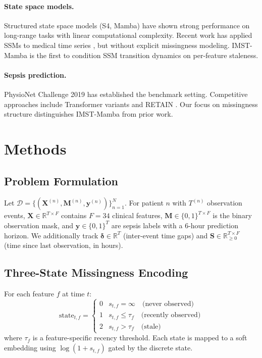 \documentclass[11pt,a4paper]{article}
\begin{document}
\paragraph{State space models.}
Structured state space models (S4, Mamba) \citep{gu2022s4,gu2023mamba} have
shown strong performance on long-range tasks with linear computational
complexity.  Recent work has applied SSMs to medical time
series \citep{nguyen2024s4health}, but without explicit missingness modeling.
IMST-Mamba is the first to condition SSM transition dynamics on per-feature
staleness.

\paragraph{Sepsis prediction.}
PhysioNet Challenge 2019 \citep{reyna2020early} has established the benchmark
setting.  Competitive approaches include Transformer
variants \citep{tipirneni2022selfsupervised} and RETAIN \citep{choi2016retain}.
Our focus on missingness structure distinguishes IMST-Mamba from prior work.

\section{Methods}
\label{sec:methods}

\subsection{Problem Formulation}

Let $\mathcal{D} = \{(\mathbf{X}^{(n)}, \mathbf{M}^{(n)}, \mathbf{y}^{(n)})\}_{n=1}^{N}$.
For patient $n$ with $T^{(n)}$ observation events,
$\mathbf{X} \in \mathbb{R}^{T \times F}$ contains $F=34$ clinical features,
$\mathbf{M} \in \{0,1\}^{T \times F}$ is the binary observation mask, and
$\mathbf{y} \in \{0,1\}^T$ are sepsis labels with a 6-hour prediction horizon.
We additionally track $\boldsymbol{\delta} \in \mathbb{R}^T$ (inter-event time
gaps) and $\mathbf{S} \in \mathbb{R}_{\geq 0}^{T \times F}$ (time since last
observation, in hours).

\subsection{Three-State Missingness Encoding}

For each feature $f$ at time $t$:
\begin{equation}
  \text{state}_{t,f} = \begin{cases}
    0 & s_{t,f} = \infty \quad \text{(never observed)} \\
    1 & s_{t,f} \leq \tau_f \quad \text{(recently observed)} \\
    2 & s_{t,f} > \tau_f \quad \text{(stale)}
  \end{cases}
  \label{eq:states}
\end{equation}
where $\tau_f$ is a feature-specific recency threshold.  Each state is mapped
to a soft embedding using $\log(1 + s_{t,f})$ gated by the discrete state.
\end{document}
